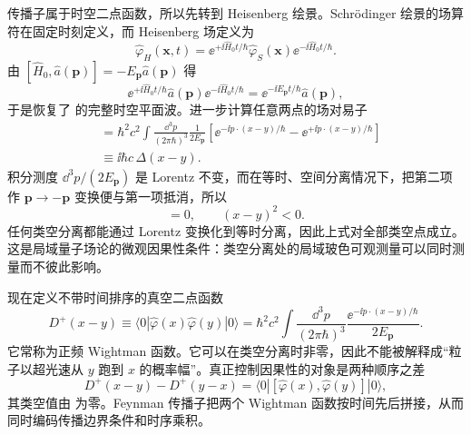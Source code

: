 传播子属于时空二点函数，所以先转到 Heisenberg 绘景。Schr\"odinger 绘景的场算符在固定时刻定义，而 Heisenberg 场定义为
\begin{equation*}
 \hat\varphi_H(\mathbf x,t)
 =\ee^{+\ii\hat H_0t/\hbar}\hat\varphi_S(\mathbf x)
 \ee^{-\ii\hat H_0t/\hbar}.
\end{equation*}
由 $[\hat H_0,\hat a(\mathbf p)]=-E_{\mathbf p}\hat a(\mathbf p)$ 得
\begin{equation*}
 \ee^{+\ii\hat H_0t/\hbar}\hat a(\mathbf p)\ee^{-\ii\hat H_0t/\hbar}
 =\ee^{-\ii E_{\mathbf p}t/\hbar}\hat a(\mathbf p),
\end{equation*}
于是恢复了  的完整时空平面波。进一步计算任意两点的场对易子
\begin{align}
 [\hat\varphi(x),\hat\varphi(y)]
 &=\hbar^2c^2\int\frac{\dd^3 p}{(2\pi\hbar)^3}
 \frac{1}{2E_{\mathbf p}}
 \left[\ee^{-\ii p\cdot(x-y)/\hbar}-\ee^{+\ii p\cdot(x-y)/\hbar}\right]\\
 &\equiv \ii\hbar c\,\Delta(x-y).
 \label{eq:pauli-jordan-r3}
\end{align}
积分测度 $\dd^3 p/(2E_{\mathbf p})$ 是 Lorentz 不变，而在等时、空间分离情况下，把第二项作 $\mathbf p\to-\mathbf p$ 变换便与第一项抵消，所以
\begin{equation}
 [\hat\varphi(x),\hat\varphi(y)]=0,
 \qquad (x-y)^2<0.
 \label{eq:microcausality-scalar-r3}
\end{equation}
任何类空分离都能通过 Lorentz 变换化到等时分离，因此上式对全部类空点成立。这是局域量子场论的微观因果性条件：类空分离处的局域玻色可观测量可以同时测量而不彼此影响。

现在定义不带时间排序的真空二点函数
\begin{equation}
 D^+(x-y)\equiv
 \langle0|\hat\varphi(x)\hat\varphi(y)|0\rangle
 =\hbar^2c^2\int\frac{\dd^3 p}{(2\pi\hbar)^3}
 \frac{\ee^{-\ii p\cdot(x-y)/\hbar}}{2E_{\mathbf p}}.
 \label{eq:wightman-plus-r3}
\end{equation}
它常称为正频 Wightman 函数。它可以在类空分离时非零，因此不能被解释成“粒子以超光速从 $y$ 跑到 $x$ 的概率幅”。真正控制因果性的对象是两种顺序之差
\begin{equation*}
 D^+(x-y)-D^+(y-x)
 =\langle0|[\hat\varphi(x),\hat\varphi(y)]|0\rangle,
\end{equation*}
其类空值由  为零。Feynman 传播子把两个 Wightman 函数按时间先后拼接，从而同时编码传播边界条件和时序乘积。



